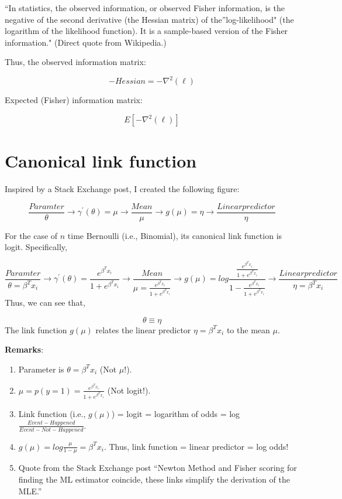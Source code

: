 \documentclass[]{book}
\begin{document}
``In statistics, the observed information, or observed Fisher information, is the negative of the second derivative (the Hessian matrix) of the''log-likelihood" (the logarithm of the likelihood function). It is a sample-based version of the Fisher information." (Direct quote from Wikipedia.)

Thus, the observed information matrix:

\[-Hessian=-\nabla ^2(\ell) \]

Expected (Fisher) information matrix:

\[E[-\nabla ^2(\ell)] \]

\hypertarget{canonical-link-function}{%
\chapter{Canonical link function}\label{canonical-link-function}}

Inspired by a Stack Exchange post, I created the following figure:

\[ \frac{Paramter}{\theta} \longrightarrow \gamma^{'}(\theta) = \mu \longrightarrow \frac{Mean}{\mu} \longrightarrow g(\mu) = \eta \longrightarrow \frac{ Linear predictor}{\eta} \]

For the case of \(n\) time Bernoulli (i.e., Binomial), its canonical link function is logit. Specifically,

\[ \frac{Paramter}{\theta=\beta^Tx_i}  \longrightarrow \gamma^{'}(\theta)= \frac{e^{\beta^Tx_i}}{1+e^{\beta^Tx_i}}\longrightarrow \frac{Mean}{\mu=\frac{e^{\beta^Tx_i}}{1+e^{\beta^Tx_i}}}\longrightarrow g(\mu) = log \frac{\frac{e^{\beta^Tx_i}}{1+e^{\beta^Tx_i}}}{1-\frac{e^{\beta^Tx_i}}{1+e^{\beta^Tx_i}}}\longrightarrow \frac{ Linear predictor}{\eta = \beta^Tx_i}\]
Thus, we can see that,

\[\theta \equiv \eta \]
The link function \(g(\mu)\) relates the linear predictor \(\eta = \beta^Tx_i\) to the mean \(\mu\).

\textbf{Remarks}:

\begin{enumerate}
\def\labelenumi{(\arabic{enumi})}
\item
  Parameter is \(\theta = \beta ^T x_i\) (Not \(\mu\)!).
\item
  \(\mu=p(y=1)=\frac{e^{\beta^Tx_i}}{1+e^{\beta^Tx_i}}\) (Not logit!).
\item
  Link function (i.e., \(g(\mu)\)) = logit = logarithm of odds = log \(\frac{Event - Happened }{Event - Not - Happened}\).
\item
  \(g(\mu) = log \frac{\mu}{1-\mu}=\beta^T x_i\). Thus, link function = linear predictor = log odds!
\item
  Quote from the Stack Exchange post ``Newton Method and Fisher scoring for finding the ML estimator coincide, these links simplify the derivation of the MLE.''
\end{enumerate}
\end{document}
